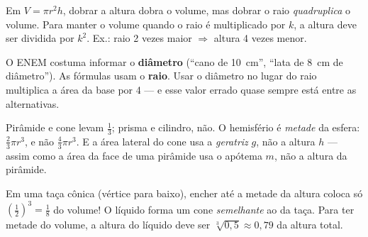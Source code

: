\begin{macete}
Em $V = \pi r^2 h$, dobrar a altura dobra o volume, mas dobrar o raio
\emph{quadruplica} o volume. Para manter o volume quando o raio é multiplicado
por $k$, a altura deve ser dividida por $k^2$. Ex.: raio 2 vezes maior
$\Rightarrow$ altura 4 vezes menor.
\end{macete}

\begin{atencao}
O ENEM costuma informar o \textbf{diâmetro} (“cano de 10~cm”, “lata de 8~cm de
diâmetro”). As fórmulas usam o \textbf{raio}. Usar o diâmetro no lugar do raio
multiplica a área da base por 4 — e esse valor errado quase sempre está entre
as alternativas.
\end{atencao}

\begin{atencao}
Pirâmide e cone levam $\frac13$; prisma e cilindro, não. O hemisfério é
\emph{metade} da esfera: $\frac23\pi r^3$, e não $\frac43\pi r^3$. E a área
lateral do cone usa a \emph{geratriz} $g$, não a altura $h$ — assim como a área
da face de uma pirâmide usa o apótema $m$, não a altura da pirâmide.
\end{atencao}

\begin{atencao}
Em uma taça cônica (vértice para baixo), encher até a metade da altura coloca
só $\left(\frac12\right)^3 = \frac18$ do volume! O líquido forma um cone
\emph{semelhante} ao da taça. Para ter metade do volume, a altura do líquido
deve ser $\sqrt[3]{0{,}5}\approx 0{,}79$ da altura total.
\end{atencao}


